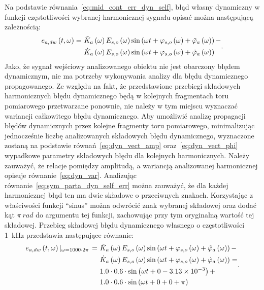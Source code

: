 Na podstawie równania~\eqref{eq:mid_cont_err_dyn_self}, błąd własny dynamiczny w funkcji częstotliwości wybranej harmonicznej sygnału opisać można następującą zależnością:
\begin{equation}
\begin{split}
e_{a,dw} \left(t,\omega\right) =~
& \tilde{K}_{a} \left(\omega\right) E_{s,o} \left(\omega\right) \sin \left( \omega t + \varphi_{s,o} \left(\omega\right) + \tilde{\varphi}_{a} \left(\omega\right) \right) - \\
& \dot{K}_{a} \left(\omega\right) E_{s,o} \left(\omega\right) \sin \left( \omega t + \varphi_{s,o} \left(\omega\right) + \dot{\varphi}_{a} \left(\omega\right) \right)
\end{split}
\label{eq:sym_parta_dyn_self_err}.
\end{equation}
Jako, że sygnał wejściowy analizowanego obiektu nie jest obarczony błędem dynamicznym, nie ma potrzeby wykonywania analizy dla błędu dynamicznego propagowanego. Ze względu na fakt, że przedstawione przebiegi składowych harmonicznych błędu dynamicznego będą w kolejnych fragmentach toru pomiarowego przetwarzane ponownie, nie należy w tym miejscu wyznaczać wariancji całkowitego błędu dynamicznego. Aby umożliwić analizę propagacji błędów dynamicznych przez kolejne fragmenty toru pomiarowego, minimalizując jednocześnie liczbę analizowanych składowych błędu dynamicznego, wyznaczone zostaną na podstawie równań~\eqref{eq:dyn_vect_amp} oraz~\eqref{eq:dyn_vect_phi} wypadkowe parametry składowych błędu dla kolejnych harmonicznych. Należy zauważyć, że relacje pomiędzy amplitudą, a wariancją analizowanej harmonicznej opisuje równanie~\eqref{eq:dyn_var}. Analizując równanie~\eqref{eq:sym_parta_dyn_self_err} można zauważyć, że dla każdej harmonicznej błąd ten ma dwie składowe o przeciwnych znakach. Korzystając z właściwości funkcji \enquote{sinus} można odwrócić znak wybranej składowej oraz dodać kąt $\pi~\unit{rad}$ do argumentu tej funkcji, zachowując przy tym oryginalną wartość tej składowej. Przebieg składowej błędu dynamicznego własnego o częstotliwości \qty{1}{kHz} przedstawia następujące równanie:
\begin{equation}
\begin{split}
e_{a,dw} \left(t,\omega\right) \left|_{\omega = 1000 \cdot 2 \pi } \right. =~
& \tilde{K}_{a} \left(\omega\right) E_{s,o} \left(\omega\right) \sin \left( \omega t + \varphi_{s,o} \left(\omega\right) + \tilde{\varphi}_{a} \left(\omega\right) \right) - \\
& \dot{K}_{a} \left(\omega\right) E_{s,o} \left(\omega\right) \sin \left( \omega t + \varphi_{s,o} \left(\omega\right) + \dot{\varphi}_{a} \left(\omega\right) \right) = \\
& 1.0 \cdot 0.6 \cdot \sin \left( \omega t + 0 - \num{3.13e-3} \right) + \\
& 1.0 \cdot 0.6 \cdot \sin \left( \omega t + 0 + 0 + \pi \right)
\end{split}
\label{eq:sym_parta_dyn_self_example_harm}.
\end{equation}

